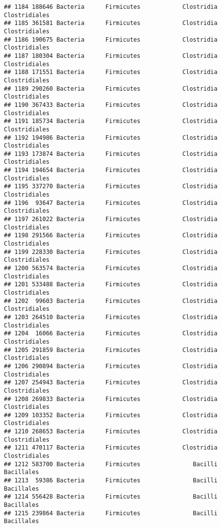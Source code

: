 \documentclass[
]{article}
\begin{document}
\begin{verbatim}
## 1184 188646 Bacteria      Firmicutes            Clostridia       Clostridiales
## 1185 361581 Bacteria      Firmicutes            Clostridia       Clostridiales
## 1186 190675 Bacteria      Firmicutes            Clostridia       Clostridiales
## 1187 180304 Bacteria      Firmicutes            Clostridia       Clostridiales
## 1188 171551 Bacteria      Firmicutes            Clostridia       Clostridiales
## 1189 290260 Bacteria      Firmicutes            Clostridia       Clostridiales
## 1190 367433 Bacteria      Firmicutes            Clostridia       Clostridiales
## 1191 185734 Bacteria      Firmicutes            Clostridia       Clostridiales
## 1192 194986 Bacteria      Firmicutes            Clostridia       Clostridiales
## 1193 173874 Bacteria      Firmicutes            Clostridia       Clostridiales
## 1194 194654 Bacteria      Firmicutes            Clostridia       Clostridiales
## 1195 337270 Bacteria      Firmicutes            Clostridia       Clostridiales
## 1196  93647 Bacteria      Firmicutes            Clostridia       Clostridiales
## 1197 261022 Bacteria      Firmicutes            Clostridia       Clostridiales
## 1198 291566 Bacteria      Firmicutes            Clostridia       Clostridiales
## 1199 228330 Bacteria      Firmicutes            Clostridia       Clostridiales
## 1200 563574 Bacteria      Firmicutes            Clostridia       Clostridiales
## 1201 533488 Bacteria      Firmicutes            Clostridia       Clostridiales
## 1202  99603 Bacteria      Firmicutes            Clostridia       Clostridiales
## 1203 264510 Bacteria      Firmicutes            Clostridia       Clostridiales
## 1204  16066 Bacteria      Firmicutes            Clostridia       Clostridiales
## 1205 291859 Bacteria      Firmicutes            Clostridia       Clostridiales
## 1206 290894 Bacteria      Firmicutes            Clostridia       Clostridiales
## 1207 254943 Bacteria      Firmicutes            Clostridia       Clostridiales
## 1208 269833 Bacteria      Firmicutes            Clostridia       Clostridiales
## 1209 103352 Bacteria      Firmicutes            Clostridia       Clostridiales
## 1210 268653 Bacteria      Firmicutes            Clostridia       Clostridiales
## 1211 470117 Bacteria      Firmicutes            Clostridia       Clostridiales
## 1212 583700 Bacteria      Firmicutes               Bacilli          Bacillales
## 1213  59386 Bacteria      Firmicutes               Bacilli          Bacillales
## 1214 556428 Bacteria      Firmicutes               Bacilli          Bacillales
## 1215 239864 Bacteria      Firmicutes               Bacilli          Bacillales

\end{verbatim}
\end{document}

